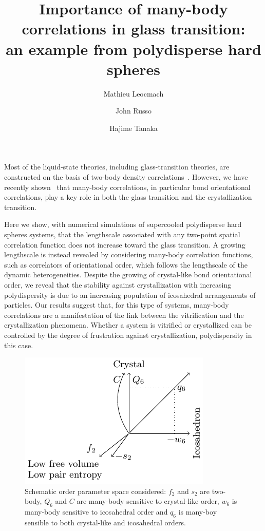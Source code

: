 \documentclass{vl4}
\begin{document}
\title{Importance of many-body correlations in glass transition:\\an example from polydisperse hard spheres} 

\author{Mathieu Leocmach}
\author{John Russo}
\author{Hajime Tanaka}

\maketitle

Most of the liquid-state theories, including glass-transition theories, are constructed on the basis of two-body density correlations~\cite{lubchenko2007,Biroli2008,Parisi2010}. 
However, we have recently shown~\cite{tanaka,watanabe_walls,KawasakiJPCM} that many-body correlations, in particular bond orientational correlations, play a key role in both the glass transition and the crystallization transition.

Here we show, with numerical simulations of supercooled polydisperse hard spheres systems, that the lengthscale associated with any two-point spatial correlation function does not increase toward the glass transition. A growing lengthscale is instead revealed by considering many-body correlation functions, such as correlators of orientational order, which follows the lengthscale of the dynamic heterogeneities.
Despite the growing of crystal-like bond orientational order, we reveal that the stability against crystallization with increasing polydispersity is due to an increasing population of icosahedral arrangements of particles. 
Our results suggest that, for this type of systems, many-body correlations are a manifestation of the link between the vitrification and the crystallization phenomena.
Whether a system is vitrified or crystallized can be controlled by the degree of frustration against crystallization, polydispersity in this case.  

\begin{figure}
	\centering
	\includegraphics{fig_parameters}
	\caption{Schematic order parameter space considered: $f_2$ and $s_2$ are two-body, $Q_6$ and $C$ are many-body sensitive to crystal-like order, $w_6$ is many-body sensitive to icosahedral order and $q_6$ is many-boy sensible to both crystal-like and icosahedral orders.}
	\label{fig:parameters}
\end{figure}
\end{document}
